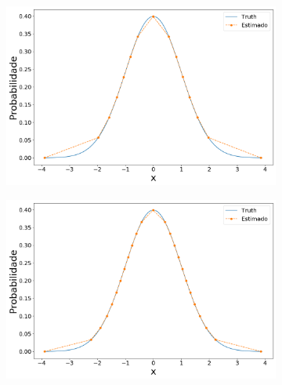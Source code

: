 \begin{figure}[H]
	\centering
	\begin{subfigure}[b]{0.45\textwidth}
		\centering 
		\includegraphics[width=\linewidth]{./figuras/iPDF1_normal_15_1_0_0}
		\caption{}
		\label{fig:ipdfnorm15}
	\end{subfigure}
	\hfill
	\begin{subfigure}[b]{0.45\textwidth}
		\centering 
		\includegraphics[width=\linewidth]{./figuras/iPDF1_normal_25_1_0_0}
		\caption{}
		\label{fig:ipdfnorm25}
	\end{subfigure}


\end{figure}
